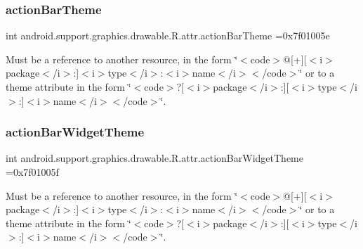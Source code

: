 \subsubsection{\texorpdfstring{action\+Bar\+Theme}{actionBarTheme}}
{\footnotesize\ttfamily int android.\+support.\+graphics.\+drawable.\+R.\+attr.\+action\+Bar\+Theme =0x7f01005e\hspace{0.3cm}{\ttfamily [static]}}

Must be a reference to another resource, in the form \char`\"{}$<$code$>$@\mbox{[}+\mbox{]}\mbox{[}$<$i$>$package$<$/i$>$\+:\mbox{]}$<$i$>$type$<$/i$>$\+:$<$i$>$name$<$/i$>$$<$/code$>$\char`\"{} or to a theme attribute in the form \char`\"{}$<$code$>$?\mbox{[}$<$i$>$package$<$/i$>$\+:\mbox{]}\mbox{[}$<$i$>$type$<$/i$>$\+:\mbox{]}$<$i$>$name$<$/i$>$$<$/code$>$\char`\"{}. \mbox{\label{classandroid_1_1support_1_1graphics_1_1drawable_1_1R_1_1attr_a9bc24c624a929c099896422e8bd59c32}} 
\subsubsection{\texorpdfstring{action\+Bar\+Widget\+Theme}{actionBarWidgetTheme}}
{\footnotesize\ttfamily int android.\+support.\+graphics.\+drawable.\+R.\+attr.\+action\+Bar\+Widget\+Theme =0x7f01005f\hspace{0.3cm}{\ttfamily [static]}}

Must be a reference to another resource, in the form \char`\"{}$<$code$>$@\mbox{[}+\mbox{]}\mbox{[}$<$i$>$package$<$/i$>$\+:\mbox{]}$<$i$>$type$<$/i$>$\+:$<$i$>$name$<$/i$>$$<$/code$>$\char`\"{} or to a theme attribute in the form \char`\"{}$<$code$>$?\mbox{[}$<$i$>$package$<$/i$>$\+:\mbox{]}\mbox{[}$<$i$>$type$<$/i$>$\+:\mbox{]}$<$i$>$name$<$/i$>$$<$/code$>$\char`\"{}. \mbox{\label{classandroid_1_1support_1_1graphics_1_1drawable_1_1R_1_1attr_a9c3722217c43ebae476c58dfb23082cd}} 
